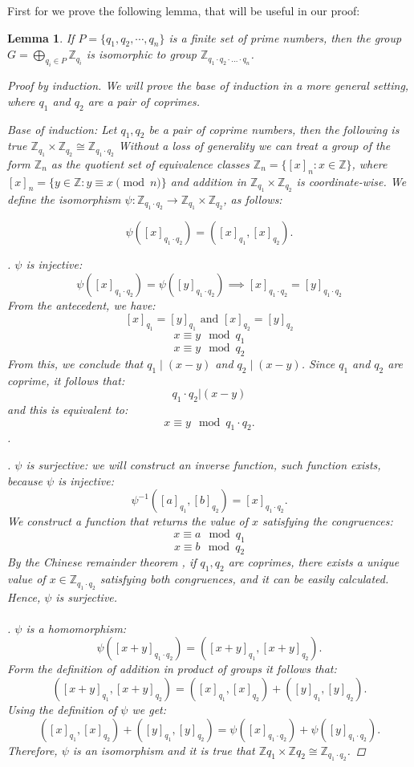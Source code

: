\documentclass{pracalicmgr2025}
\theoremstyle{plain}            %
\newtheorem{lemma}[theorem]{Lemma}
\theoremstyle{remark}           %
\theoremstyle{definition}       %
\begin{document}
First for we prove the following lemma, that will be useful in our proof:
\begin{lemma} \label{Z primes}
    If $P=\{q_1, q_2, \cdots,q_n\}$ is a finite set of prime numbers, then the group $G = \bigoplus_{q_i \in P}\mathbb{Z}_{q_i}$ is isomorphic to group $\mathbb{Z}_{q_1 \cdot q_2 \cdot... \cdot q_n}$.
    \begin{proof}[Proof by induction]
    We will prove the base of induction in a more general setting, where $q_1$ and $q_2$ are a pair of coprimes.
     
     
     \textit{Base of induction}: Let $q_1, q_2$ be a pair of coprime numbers, then the following is true $\mathbb{Z}_{q_1} \times \mathbb{Z}_{q_2} \cong \mathbb{Z}_{q_1 \cdot q_2}$
         Without a loss of generality we can treat a group of the form $\mathbb{Z}_n$ as the \emph{quotient set} of equivalence classes $\mathbb{Z}_n = \{[x]_n : x \in \mathbb{Z}\}$, where $[x]_n = \{y \in \mathbb{Z} : y \equiv x \pmod{n}\}$ and addition in $\mathbb{Z}_{q_1} \times \mathbb{Z}_{q_2}$ is coordinate-wise. We define the isomorphism $\psi : \mathbb{Z}_{q_1\cdot q_2} \to \mathbb{Z}_{q_1}\times \mathbb{Z}_{q_2}$, as follows:
        
        $$\psi([x]_{q_1 \cdot q_2}) = ([x]_{q_1}, [x]_{q_2}).$$

        . $\psi$ is injective:
        $$\psi([x]_{q_1\cdot q_2}) = \psi([y]_{q_1\cdot q_2})\implies  [x]_{q_1 \cdot q_2}=[y]_{q_1 \cdot q_2} $$
        From the antecedent, we have:
        $$[x]_{q_1} = [y]_{q_1} \text{ and } [x]_{q_2} = [y]_{q_2} $$
        $$x \equiv y \mod q_1$$
        $$x \equiv y \mod q_2$$
        From this, we conclude that $q_1 \mid (x - y)$ and $q_2 \mid (x - y)$. Since $q_1$ and $q_2$ are coprime, it follows that: 
        $$q_1\cdot q_2|(x-y)$$
        and this is equivalent to:
        $$x \equiv y \mod q_1 \cdot q_2.$$.

        
        . $\psi$ is surjective: we will construct an inverse function, such function exists, because $\psi$ is injective:
        $$\psi^{-1}([a]_{q_1},[b]_{q_2}) =[x]_{q_1\cdot q_2}.$$
        We construct a function that returns the  value of $x$ satisfying  the congruences:
        $$x \equiv a \mod q_1$$
        $$x \equiv b \mod q_2$$
        By the Chinese remainder theorem \cite{7}, if $q_1,q_2$ are coprimes, there exists a unique value of $x \in \mathbb{Z}_{q_1 \cdot q_2}$ satisfying both congruences, and it can be easily calculated. Hence, $\psi$ is surjective.
        \\
        \\
        . $\psi$ is a homomorphism:
        $$\psi([x+y]_{q_1\cdot q_2}) = ([x+y]_{q_1},[x+y]_{q_2}).$$
        Form the definition of addition in product of groups it follows that:
        $$([x+y]_{q_1},[x+y]_{q_2}) = ([x]_{q_1},[x]_{q_2})+([y]_{q_1},[y]_{q_2}).$$
        Using the definition of $\psi$ we get:
        $$([x]_{q_1},[x]_{q_2})+([y]_{q_1},[y]_{q_2}) = \psi([x]_{q_1\cdot q_2})+\psi([y]_{q_1\cdot q_2}).$$
        Therefore, $\psi$ is an isomorphism and it is true that $\mathbb{Z}{q_1} \times \mathbb{Z}{q_2} \cong \mathbb{Z}_{q_1 \cdot q_2}$.


\end{proof}
\end{lemma}
\end{document}

